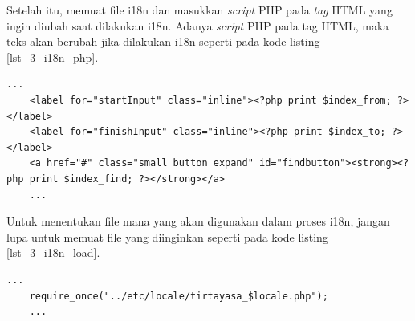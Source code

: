 Setelah itu, memuat file i18n dan masukkan \textit{script} PHP pada \textit{tag} HTML yang ingin diubah saat dilakukan i18n. Adanya \textit{script} PHP pada tag HTML, maka teks akan berubah jika dilakukan i18n seperti pada kode listing \ref{lst_3_i18n_php}.

\begin{lstlisting}[caption=Script PHP untuk Internationalization,label = {lst_3_i18n_php}]
	...
	<label for="startInput" class="inline"><?php print $index_from; ?></label>
	<label for="finishInput" class="inline"><?php print $index_to; ?></label>
	<a href="#" class="small button expand" id="findbutton"><strong><?php print $index_find; ?></strong></a>
	...
\end{lstlisting}

Untuk menentukan file mana yang akan digunakan dalam proses i18n, jangan lupa untuk memuat file yang diinginkan seperti pada kode listing \ref{lst_3_i18n_load}.
\begin{lstlisting}[caption=Script PHP untuk memuat file i18n,label = {lst_3_i18n_load}]
	...
	require_once("../etc/locale/tirtayasa_$locale.php");
	...
\end{lstlisting}

